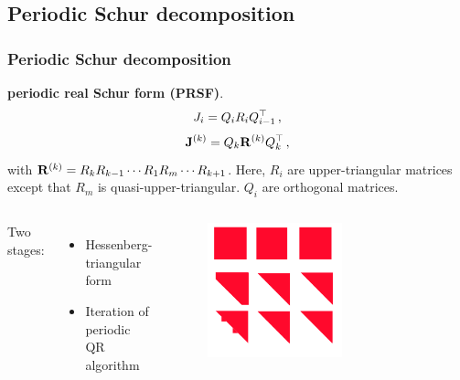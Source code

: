 \documentclass[mathserif, handout]{beamer}
\begin{document}
\subsection{Periodic Schur decomposition}

\begin{frame}
  \frametitle{Periodic Schur decomposition%
~\cite{Bojanczyk92theperiodic}}
\textbf{periodic real Schur form (PRSF)}.
  \begin{equation}
    \label{eq:prsf}
    J_{i}=Q_{i}R_{i}Q_{i-1}^\top
    \,,
  \end{equation}
\begin{equation}
  \label{eq:pedrotation}
  \mathbf{J}^{(k)}=Q_{k}\mathbf{R}^{(k)}Q_{k}^\top
  \,,
\end{equation}
with
$\mathbf{R}^{(k)}=R_{k}R_{k-1}\cdots R_{1}R_{m}\cdots R_{k+1}$. Here, $R_i$ are
{\color{red} upper-triangular} matrices except that $R_m$ is
{\color{red} quasi-upper-triangular}.
$Q_i$ are orthogonal matrices.

\pause

\begin{columns}[c]
  Two stages:
  \begin{itemize}
  \item Hessenberg-triangular form
  \item Iteration of periodic QR algorithm
  \end{itemize}

  \begin{figure}[h]
    \centering
    \includegraphics[width=0.6\textwidth]{per_schur_algorithm.pdf}
  \end{figure}

\end{columns}



\end{frame}
\end{document}
